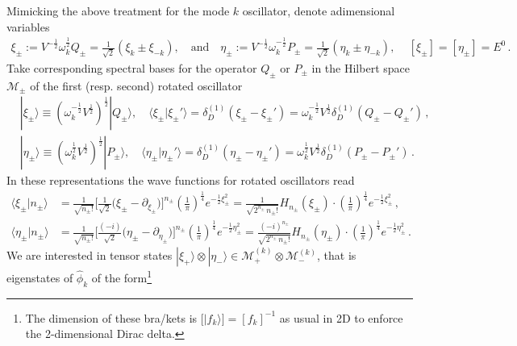 \documentclass[../QFT_main.tex]{subfiles}
\begin{document}
\begin{mytheorem}
Mimicking the above treatment for the mode $k$ oscillator, denote adimensional variables
\begin{align}
    \xi_\pm := V^{-\frac{1}{2}} \omega_k^{\frac{1}{2}} Q_\pm = \frac{1}{\sqrt{2}}(\xi_k \pm \xi_{-k}),\quad\text{and}\quad
    \eta_\pm := V^{-\frac{1}{2}} \omega_k^{-\frac{1}{2}} P_\pm = \frac{1}{\sqrt{2}}(\eta_k \pm \eta_{-k}),\quad \,[\xi_\pm]=[\eta_\pm]=E^0\,.
\end{align}
%
Take corresponding spectral bases for the operator $Q_{\pm}$ or $P_{\pm}$ in the Hilbert space $\mathcal{M}_{\pm}$ of the first (resp. second) rotated oscillator 
\begin{align}
    &|\xi_{\pm}\rangle \equiv \left(\omega_k^{-\frac{1}{2}} V^{\frac{1}{2}}\right)^{\frac{1}{2}}|Q_{\pm}\rangle, \quad
     \langle \xi_{\pm} | \xi_{\pm}' \rangle = \delta^{(1)}_D(\xi_{\pm} - \xi_{\pm}') = \omega_k^{-\frac{1}{2}} V^{\frac{1}{2}}\delta^{(1)}_D(Q_{\pm} - Q_{\pm}')\,,
    \\
    &|\eta_{\pm}\rangle \equiv \left(\omega_k^{\frac{1}{2}} V^{\frac{1}{2}}\right)^{\frac{1}{2}} |P_{\pm}\rangle,\quad
    \langle \eta_{\pm} | \eta_{\pm}' \rangle = \delta^{(1)}_D(\eta_{\pm} - \eta_{\pm}') = \omega_k^{\frac{1}{2}} V^{\frac{1}{2}}\delta^{(1)}_D(P_{\pm} - P_{\pm}')\,.
\end{align}
%
In these representations the wave functions for rotated oscillators read
\begin{align}
    \langle \xi_{\pm} | n_{\pm} \rangle & = \frac{1}{\sqrt{n_{\pm}!}}  \Big[\tfrac{1}{\sqrt{2}}\big(\xi_\pm-\partial_{\xi_\pm}\big)\Big]^{n_\pm} \left( \tfrac{1}{\pi} \right)^{\frac{1}{4}} e^{-\frac{1}{2}\xi_{\pm}^2}
    =\frac{1}{\sqrt{2^{n_{\pm}} \,n_{\pm}!}} H_{n_{\pm}}(\xi_{\pm}) \cdot \left( \tfrac{1}{\pi} \right)^{\frac{1}{4}} e^{-\frac{1}{2}\xi_{\pm}^2}\,,
    \\
    \langle \eta_{\pm} | n_{\pm} \rangle &= \frac{1}{\sqrt{n_{\pm}!}} \Big[\tfrac{(-i)}{\sqrt{2}}\big(\eta_\pm-\partial_{\eta_\pm}\big)\Big]^{n_\pm} \left(\tfrac{1}{\pi}\right)^{\frac{1}{4}} e^{-\frac{1}{2}\eta_{\pm}^2}
    = \frac{(-i)^{n_{\pm}}}{\sqrt{2^{n_{\pm}} \,n_{\pm}!}} H_{n_{\pm}}(\eta_{\pm}) \cdot \left( \tfrac{1}{\pi} \right)^{\frac{1}{4}} e^{-\frac{1}{2}\eta_{\pm}^2}\,.
\end{align}
%
We are interested in tensor states $|\xi_+\rangle \otimes |\eta_-\rangle\in \mathcal{M}^{(k)}_+\otimes \mathcal{M}^{(k)}_-$, that is eigenstates of $\hat{\phi}_k$ of the form\footnote{The dimension of these bra/kets is $\big[|f_k\rangle \big]= [f_k]^{-1}$ as usual in 2D to enforce the 2-dimensional Dirac delta.}

\end{mytheorem}
\end{document}
